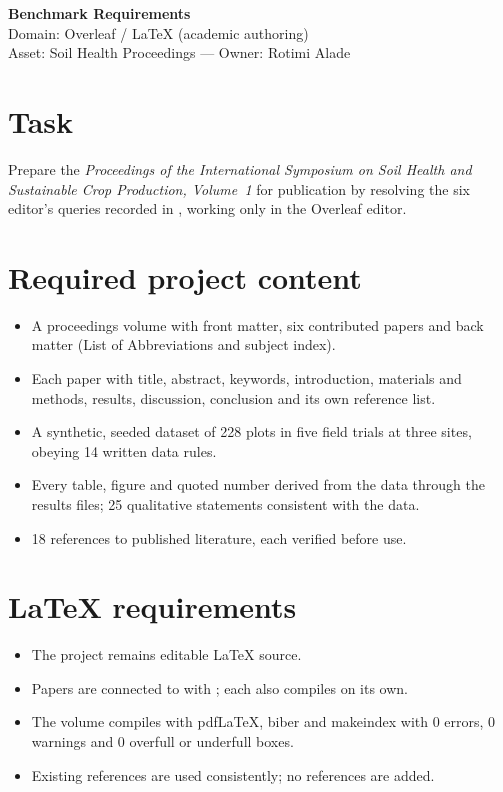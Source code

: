 \documentclass[11pt,a4paper]{article}
\begin{document}
\begin{center}
  {\Large\bfseries Benchmark Requirements}\\[4pt]
  Domain: Overleaf / \LaTeX{} (academic authoring)\\
  Asset: Soil Health Proceedings --- Owner: Rotimi Alade
\end{center}

\section*{Task}
Prepare the \emph{Proceedings of the International Symposium on Soil Health and
Sustainable Crop Production, Volume~1} for publication by resolving the six
editor's queries recorded in , working only in the
Overleaf editor.

\section*{Required project content}
\begin{itemize}
  \item A proceedings volume with front matter, six contributed papers and back
    matter (List of Abbreviations and subject index).
  \item Each paper with title, abstract, keywords, introduction, materials and
    methods, results, discussion, conclusion and its own reference list.
  \item A synthetic, seeded dataset of 228 plots in five field trials at three
    sites, obeying 14 written data rules.
  \item Every table, figure and quoted number derived from the data through the
    results files; 25 qualitative statements consistent with the data.
  \item 18 references to published literature, each verified before use.
\end{itemize}

\section*{\LaTeX{} requirements}
\begin{itemize}
  \item The project remains editable \LaTeX{} source.
  \item Papers are connected to  with ; each
    also compiles on its own.
  \item The volume compiles with pdf\LaTeX{}, biber and makeindex with 0 errors,
    0 warnings and 0 overfull or underfull boxes.
  \item Existing references are used consistently; no references are added.
\end{itemize}
\end{document}
